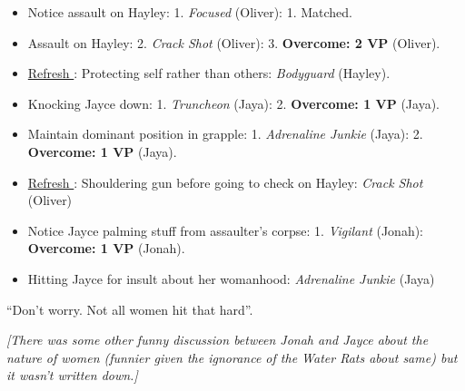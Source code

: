 {\begin{itemize}
\item Notice assault on Hayley: 1.  \textit{Focused} (Oliver): 1.  Matched.
\item Assault on Hayley: 2.\textit{  Crack Shot} (Oliver): 3.  \textbf{Overcome: 2 VP} (Oliver).
\item \underline{ Refresh }: Protecting self rather than others:\textit{ Bodyguard} (Hayley).
\item Knocking Jayce down: 1.  \textit{Truncheon} (Jaya): 2.  \textbf{Overcome: 1 VP} (Jaya).
\item Maintain dominant position in grapple: 1.  \textit{Adrenaline Junkie} (Jaya): 2.  \textbf{Overcome: 1 VP} (Jaya).
\item \underline{ Refresh }: Shouldering gun before going to check on Hayley:\textit{ Crack Shot} (Oliver)
\item Notice Jayce palming stuff from assaulter's corpse: 1.  \textit{Vigilant} (Jonah):  \textbf{Overcome: 1 VP} (Jonah).
\item Hitting Jayce for insult about her womanhood:\textit{ Adrenaline Junkie} (Jaya)
\end{itemize}

}





``Don't worry.  Not all women hit that hard''.






\textit{{[}}\textit{There was some other funny discussion between Jonah and Jayce about the nature of women (funnier given the ignorance of the Water Rats about same) but it wasn't written down.{]}}


\vspace{\fill}

